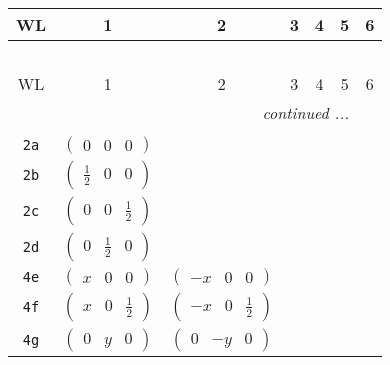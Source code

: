 \documentclass[fleqn,9pt,landscape]{jsarticle}
\begin{document}
\begin{center}
\renewcommand{\arraystretch}{1.2}
\begin{longtable}{ccccccc}
 \hline \hline
WL & 1 & 2 & 3 & 4 & 5 & 6 \\ \hline \endfirsthead

\multicolumn{6}{l}{\tablename\ \thetable{}} \\
 \hline \hline
WL & 1 & 2 & 3 & 4 & 5 & 6 \\ \hline \endhead

 \hline \hline
\multicolumn{6}{r}{\footnotesize\it continued ...} \\ \endfoot

 \hline \hline
\multicolumn{6}{r}{} \\ \endlastfoot

{\tt 2a} & $ \begin{pmatrix} 0 & 0 & 0 \end{pmatrix} $ & $  $ & $  $ & $  $ \\ \hline
{\tt 2b} & $ \begin{pmatrix} \frac{1}{2} & 0 & 0 \end{pmatrix} $ & $  $ & $  $ & $  $ \\ \hline
{\tt 2c} & $ \begin{pmatrix} 0 & 0 & \frac{1}{2} \end{pmatrix} $ & $  $ & $  $ & $  $ \\ \hline
{\tt 2d} & $ \begin{pmatrix} 0 & \frac{1}{2} & 0 \end{pmatrix} $ & $  $ & $  $ & $  $ \\ \hline
{\tt 4e} & $ \begin{pmatrix} x & 0 & 0 \end{pmatrix} $ & $ \begin{pmatrix} - x & 0 & 0 \end{pmatrix} $ & $  $ & $  $ \\ \hline
{\tt 4f} & $ \begin{pmatrix} x & 0 & \frac{1}{2} \end{pmatrix} $ & $ \begin{pmatrix} - x & 0 & \frac{1}{2} \end{pmatrix} $ & $  $ & $  $ \\ \hline
{\tt 4g} & $ \begin{pmatrix} 0 & y & 0 \end{pmatrix} $ & $ \begin{pmatrix} 0 & - y & 0 \end{pmatrix} $ & $  $ & $  $ \\ \hline

\end{longtable}
\end{center}
\end{document}

